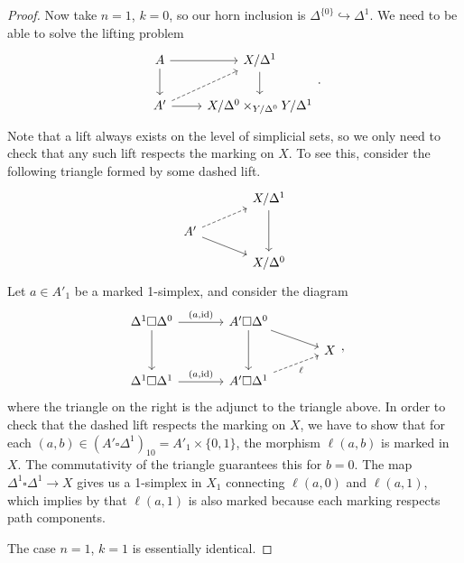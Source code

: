 \documentclass[main.tex]{subfiles}
\begin{document}
\begin{proof}
  Now take $n = 1$, $k = 0$, so our horn inclusion is $\Delta^{\{0\}} \hookrightarrow \Delta^{1}$. We need to be able to solve the lifting problem
  \begin{equation*}
    \begin{tikzcd}
      A
      \arrow[r]
      \arrow[d]
      & X / \Delta^{1}
      \arrow[d]
      \\
      A'
      \arrow[r]
      \arrow[ur, dashed]
      & X / \Delta^{0} \times_{Y / \Delta^{0}} Y / \Delta^{1}
    \end{tikzcd}.
  \end{equation*}
  Note that a lift always exists on the level of simplicial sets, so we only need to check that any such lift respects the marking on $X$. To see this, consider the following triangle formed by some dashed lift.
  \begin{equation*}
    \begin{tikzcd}[row sep=small, column sep=large]
      & X / \Delta^{1}
      \arrow[dd]
      \\
      A'
      \arrow[ur, dashed]
      \arrow[dr]
      \\
      & X / \Delta^{0}
    \end{tikzcd}
  \end{equation*}
  Let $a \in A'_{1}$ be a marked 1-simplex, and consider the diagram
  \begin{equation*}
    \begin{tikzcd}[row sep=small, column sep=large]
      \Delta^{1} \square \Delta^{0}
      \arrow[r, "{(a, \id)}"]
      \arrow[dd]
      & A' \square \Delta^{0}
      \arrow[dd]
      \arrow[dr]
      \\
      && X
      \\
      \Delta^{1} \square \Delta^{1}
      \arrow[r, "{(a, \id)}"]
      & A' \square \Delta^{1}
      \arrow[ur, dashed, swap, "\ell"]
    \end{tikzcd},
  \end{equation*}
  where the triangle on the right is the adjunct to the triangle above. In order to check that the dashed lift respects the marking on $X$, we have to show that for each $(a, b) \in (A' \square \Delta^{1})_{10} = A'_{1} \times \{0, 1\}$, the morphism $\ell(a, b)$ is marked in $X$. The commutativity of the triangle guarantees this for $b = 0$. The map $\Delta^{1} \square \Delta^{1} \to X$ gives us a 1-simplex in $X_{1}$ connecting $\ell(a, 0)$ and $\ell(a, 1)$, which implies by that $\ell(a, 1)$ is also marked because each marking respects path components.

  The case $n = 1$, $k = 1$ is essentially identical.
\end{proof}
\end{document}
